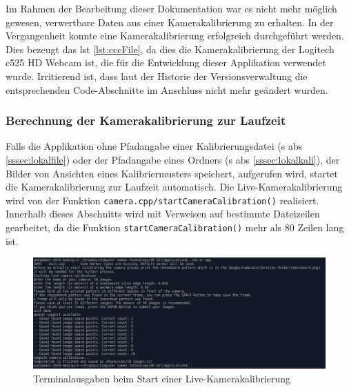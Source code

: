 \noindent Im Rahmen der Bearbeitung dieser Dokumentation war es nicht mehr möglich gewesen, verwertbare Daten aus einer Kamerakalibrierung zu erhalten. In der Vergangenheit konnte eine Kamerakalibrierung erfolgreich durchgeführt werden. Dies bezeugt das \acs{lst} \ref{lst:cccFile}, da dies die Kamerakalibrierung der Logitech c525 HD Webcam ist, die für die Entwicklung dieser Applikation verwendet wurde. Irritierend ist, dass laut der Historie der Versionsverwaltung die entsprechenden Code-Abschnitte im Anschluss nicht mehr geändert wurden.

\newpage

\subsubsection{Berechnung der Kamerakalibrierung zur Laufzeit}\label{sssec:kaliRuntime}
Falls die Applikation ohne Pfadangabe einer Kalibrierungsdatei (\acs{s} \acs{abs} \ref{sssec:lokalfile}) oder der Pfadangabe eines Ordners (\acs{s} \acs{abs} \ref{sssec:lokalkali}), der Bilder von Ansichten eines Kalibriermusters speichert, aufgerufen wird, startet die Kamerakalibrierung zur Laufzeit automatisch. Die Live-Kamerakalibrierung wird von der Funktion \texttt{camera.cpp/startCameraCalibration()} realisiert. Innerhalb dieses Abschnitts wird mit Verweisen auf bestimmte Dateizeilen gearbeitet, da die Funktion \texttt{startCameraCalibration()} mehr als 80 Zeilen lang ist.

\begin{figure}[H]
\centering
\includegraphics[width=15cm]{Bilder/Implementierung/terminal_logs2.png}
\caption{Terminalausgaben beim Start einer Live-Kamerakalibrierung}
\label{fig:startTerminalkali}
\end{figure}

